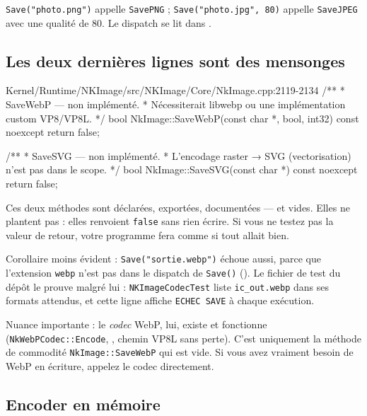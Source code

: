 \texttt{Save("photo.png")} appelle \texttt{SavePNG} ; \texttt{Save("photo.jpg",
80)} appelle \texttt{SaveJPEG} avec une qualité de 80. Le dispatch se lit dans
.

\subsection{Les deux dernières lignes sont des mensonges}

\begin{nkcode}{Kernel/Runtime/NKImage/src/NKImage/Core/NkImage.cpp:2119-2134}
    /**
     * SaveWebP — non implémenté.
     * Nécessiterait libwebp ou une implémentation custom VP8/VP8L.
     */
    bool NkImage::SaveWebP(const char *, bool, int32) const noexcept {
        return false;
    }

    /**
     * SaveSVG — non implémenté.
     * L'encodage raster → SVG (vectorisation) n'est pas dans le scope.
     */
    bool NkImage::SaveSVG(const char *) const noexcept {
        return false;
    }
\end{nkcode}

\begin{nkpiege}
Ces deux méthodes sont déclarées, exportées, documentées — et vides. Elles ne
plantent pas : elles renvoient \texttt{false} sans rien écrire. Si vous ne testez
pas la valeur de retour, votre programme fera comme si tout allait bien.

Corollaire moins évident : \texttt{Save("sortie.webp")} échoue aussi, parce que
l'extension \texttt{webp} n'est pas dans le dispatch de \texttt{Save()}
(). Le fichier de test du dépôt le prouve
malgré lui : \texttt{NKImageCodecTest} liste \texttt{ic\_out.webp} dans ses
formats attendus, et cette ligne affiche \texttt{ECHEC SAVE} à chaque exécution.

Nuance importante : le \emph{codec} WebP, lui, existe et fonctionne
(\texttt{NkWebPCodec::Encode}, , chemin
VP8L sans perte). C'est uniquement la méthode de commodité
\texttt{NkImage::SaveWebP} qui est vide. Si vous avez vraiment besoin de WebP en
écriture, appelez le codec directement.
\end{nkpiege}

\subsection{Encoder en mémoire}

